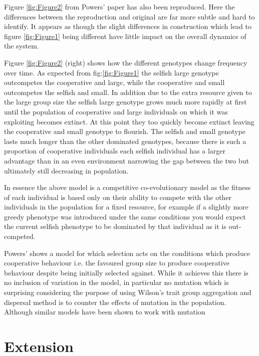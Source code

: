\documentclass[a4paper,10pt, twocolumn]{article}
\begin{document}
Figure \ref{fig:Figure2} from Powers' paper has also been reproduced. Here the differences between the reproduction and original are far more subtle and hard to identify. It appears as though the slight differences in construction which lead to figure \ref{fig:Figure1} being different have little impact on the overall dynamics of the system. 

Figure \ref{fig:Figure2} (right) shows how the different genotypes change frequency over time. As expected from fig:\ref{fig:Figure1} the selfish large genotype outcompetes the cooperative and large, while the cooperative and small outcompetes the selfish and small. In addition due to the extra resource given to the large group size the selfish large genotype grows much more rapidly at first until the population of cooperative and large individuals on which it was exploiting becomes extinct. At this point they too quickly become extinct leaving the cooperative and small genotype to flourish. The selfish and small genotype lasts much longer than the other dominated genotypes, because there is such a proportion of cooperative individuals each selfish individual has a larger advantage than in an even environment narrowing the gap between the two but ultimately still decreasing in population. 

In essence the above model is a competitive co-evolutionary model as the fitness of each individual is based only on their ability to compete with the other individuals in the population for a fixed resource, for example if a slightly more greedy phenotype was introduced under the same conditions you would expect the current selfish phenotype to be dominated by that individual as it is out-competed.

Powers' shows a model for which selection acts on the conditions which produce cooperative behaviour i.e. the favoured group size to produce cooperative behaviour despite being initially selected against. While it achieves this there is no inclusion of variation in the model, in particular no mutation which is surprising considering the purpose of using Wilson's trait group aggregation and dispersal method is to counter the effects of mutation in the population. Although similar models have been shown to work with mutation \cite{Thesis}

\section{Extension}
\end{document}
